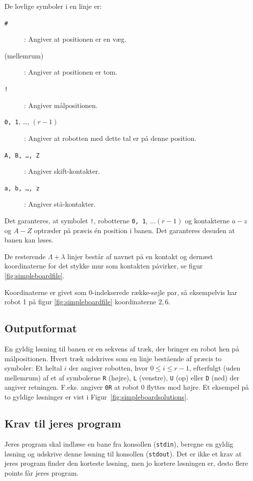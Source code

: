 \documentclass[10pt, a4paper]{article}
\begin{document}
De lovlige symboler i en linje er:

\begin{description}
\item[\texttt{\#}]: Angiver at positionen er en væg.
\item[(mellemrum)]: Angiver at positionen er tom.
\item[\texttt{!}]: Angiver målpositionen.
\item[\texttt{0, 1}, \ldots, $(r-1)$]: Angiver at robotten med dette tal er på denne position.
\item[\texttt{A, B, \ldots, Z}]: Angiver skift-kontakter.
\item[\texttt{a, b, \ldots, z}]: Angiver stå-kontakter.
\end{description}

Det garanteres, at symbolet \texttt{!}, robotterne \texttt{0, 1}, $\ldots (r-1)$ og kontakterne $a-z$ og $A-Z$ optræder på præcis én position i banen.
Det garanteres desuden at banen kan løses.

De resterende $\Lambda+\lambda$ linjer består af navnet på en kontakt og dernæst koordinaterne for det stykke mur som kontakten påvirker, se figur \ref{fig:simpleboardfile}.

Koordinaterne er givet som 0-indekserede række-søjle par, så eksempelvis har robot 1 på figur \ref{fig:simpleboardfile} koordinaterne $2, 6$.

\subsection{Outputformat}
En gyldig løsning til banen er en sekvens af træk, der bringer en robot hen på målpositionen.
Hvert træk udskrives som en linje bestående af præcis to symboler: Et heltal $i$ der angiver robotten, hvor $0 \leq i \leq r-1$, efterfulgt (uden mellemrum) af et af symbolerne \texttt{R} (højre), \texttt{L} (venstre), \texttt{U} (op) eller \texttt{D} (ned) der angiver retningen.
F.eks. angiver \texttt{0R} at robot 0 flyttes mod højre. Et eksempel på to gyldige løsninger er vist i Figur~\ref{fig:simpleboardsolutions}.

\subsection{Krav til jeres program}
Jeres program skal indlæse en bane fra konsollen (\texttt{stdin}), beregne en gyldig løsning og udskrive denne løsning til konsollen (\texttt{stdout}).
Det er ikke et krav at jeres program finder den korteste løsning, men jo kortere løsningen er, desto flere points får jeres program.
\end{document}
